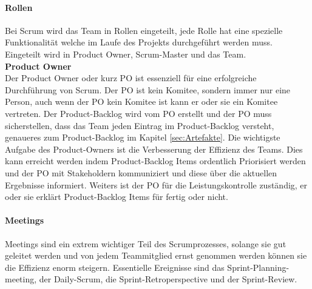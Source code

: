 	\paragraph{Rollen}
	\label{sec:Rollen}
		Bei Scrum wird das Team in Rollen eingeteilt, jede Rolle hat eine spezielle Funktionalität welche im Laufe des Projekts durchgeführt werden muss. Eingeteilt wird in Product Owner, Scrum-Master und das Team. \\

			\textbf{Product Owner} \\
			Der Product Owner oder kurz PO ist essenziell für eine erfolgreiche Durchführung von Scrum. Der PO ist kein Komitee, sondern immer nur eine Person, auch wenn der PO kein Komitee ist kann er oder sie ein Komitee vertreten. Der Product-Backlog wird vom PO erstellt und der PO muss sicherstellen, dass das Team jeden Eintrag im Product-Backlog versteht, genaueres zum Product-Backlog im Kapitel \ref{sec:Artefakte}. Die wichtigste Aufgabe des Product-Owners ist die Verbesserung der Effizienz des Teams. Dies kann erreicht werden indem Product-Backlog Items ordentlich Priorisiert werden und der PO mit Stakeholdern kommuniziert und diese über die aktuellen Ergebnisse informiert. Weiters ist der PO für die Leistungskontrolle zuständig, er oder sie erklärt Product-Backlog Items für fertig oder nicht. \textcite{ScrumProductOwner} \\
			
		
	\paragraph{Meetings}
	\label{sec:Meetings}
		Meetings sind ein extrem wichtiger Teil des Scrumprozesses, solange sie gut geleitet werden und von jedem Teammitglied ernst genommen werden können sie die Effizienz enorm steigern. Essentielle Ereignisse sind das Sprint-Planning-meeting, der Daily-Scrum, die Sprint-Retroperspective und der Sprint-Review. 

